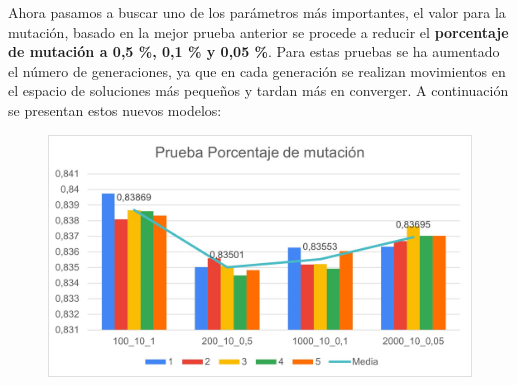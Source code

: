 \documentclass[12pt, spanish, pdftex]{UC3M_document}
\begin{document}
Ahora pasamos a buscar uno de los parámetros más importantes, el valor para la mutación, basado en la mejor prueba anterior se procede a reducir el \textbf{porcentaje de mutación a 0,5 \%, 0,1 \% y 0,05 \%}. Para estas pruebas se ha aumentado el número de generaciones, ya que en cada generación se realizan movimientos en el espacio de soluciones más pequeños y tardan más en converger. A continuación se presentan estos nuevos modelos:
\begin{figure}[H]
	{\includegraphics[scale=.8]{./img/mutation.jpg}}
\end{figure}
\end{document}
